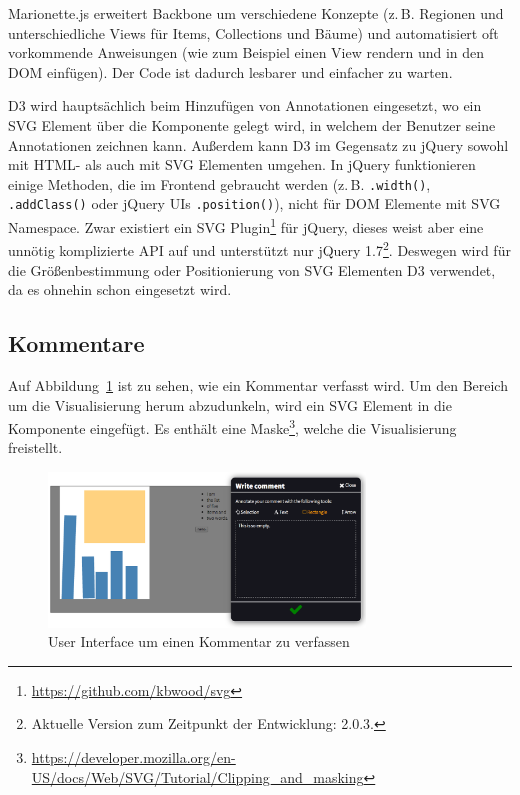 \documentclass[
	headsepline,
	footsepline,
	fontsize=12pt,
	bibliography=totoc
]{scrbook}
\begin{document}
Marionette.js erweitert Backbone um verschiedene Konzepte (z.\,B. Regionen und unterschiedliche Views für Items, Collections und Bäume) und automatisiert oft vorkommende Anweisungen (wie zum Beispiel einen View rendern und in den DOM einfügen). Der Code ist dadurch lesbarer und einfacher zu warten.

D3 wird hauptsächlich beim Hinzufügen von Annotationen eingesetzt, wo ein SVG Element über die Komponente gelegt wird, in welchem der Benutzer seine Annotationen zeichnen kann. Außerdem kann D3 im Gegensatz zu jQuery sowohl mit HTML- als auch mit SVG Elementen umgehen. In jQuery funktionieren einige Methoden, die im Frontend gebraucht werden (z.\,B. \texttt{.width()}, \texttt{.addClass()} oder jQuery UIs \texttt{.position()}), nicht für DOM Elemente mit SVG Namespace. Zwar existiert ein SVG Plugin\footnote{\url{https://github.com/kbwood/svg}} für jQuery, dieses weist aber eine unnötig komplizierte API auf und unterstützt nur jQuery 1.7\footnote{Aktuelle Version zum Zeitpunkt der Entwicklung: 2.0.3.}. Deswegen wird für die Größenbestimmung oder Positionierung von SVG Elementen D3 verwendet, da es ohnehin schon eingesetzt wird.

\subsection{Kommentare}
\label{section:implementierung:frontend:kommentare}

Auf Abbildung~\ref{figure:write-comment} ist zu sehen, wie ein Kommentar verfasst wird. Um den Bereich um die Visualisierung herum abzudunkeln, wird ein SVG Element in die Komponente eingefügt. Es enthält eine Maske\footnote{\url{https://developer.mozilla.org/en-US/docs/Web/SVG/Tutorial/Clipping_and_masking}}, welche die Visualisierung freistellt.

\begin{figure}[htbp]
   \centering
   \includegraphics[width=0.75\textwidth]{images/implementierung-write-comment.png}
   \caption{User Interface um einen Kommentar zu verfassen}
   \label{figure:write-comment}
\end{figure}
\end{document}
